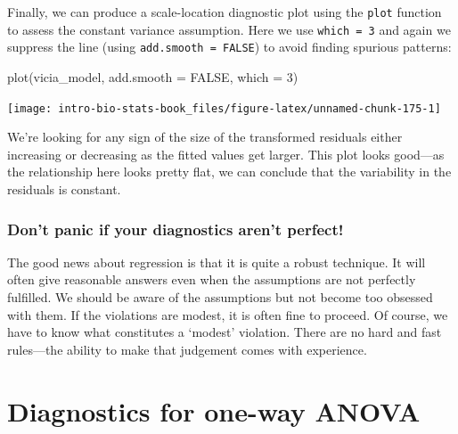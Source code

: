 \documentclass[
]{book}
\newenvironment{Shaded}{\begin{snugshade}}{\end{snugshade}}
\newcommand{\AttributeTok}[1]{\textcolor[rgb]{0.77,0.63,0.00}{#1}}
\newcommand{\ConstantTok}[1]{\textcolor[rgb]{0.00,0.00,0.00}{#1}}
\newcommand{\DecValTok}[1]{\textcolor[rgb]{0.00,0.00,0.81}{#1}}
\newcommand{\FunctionTok}[1]{\textcolor[rgb]{0.00,0.00,0.00}{#1}}
\newcommand{\NormalTok}[1]{#1}
\newenvironment{greybox}{
  \definecolor{shadecolor}{rgb}{0.95,0.95,0.95}  %
  \color{black}
  \begin{shaded}}
 {\end{shaded}}
\newenvironment{infobox}[1]
  {
  \begin{itemize}
  \renewcommand{\labelitemi}{
    \raisebox{-.7\height}[0pt][0pt]{
      {\setkeys{Gin}{width=3em,keepaspectratio}
        \texttt{[image: images/\#1]}}
    }
  }
  \setlength{\fboxsep}{1em}
  \begin{greybox}
  \item
  }
  {
  \end{greybox}
  \end{itemize}
  }
\begin{document}
Finally, we can produce a scale-location diagnostic plot using the \texttt{plot} function to assess the constant variance assumption. Here we use \texttt{which\ =\ 3} and again we suppress the line (using \texttt{add.smooth\ =\ FALSE}) to avoid finding spurious patterns:

\begin{Shaded}
\begin{Highlighting}[]
\FunctionTok{plot}\NormalTok{(vicia\_model, }\AttributeTok{add.smooth =} \ConstantTok{FALSE}\NormalTok{, }\AttributeTok{which =} \DecValTok{3}\NormalTok{)}
\end{Highlighting}
\end{Shaded}

\begin{center}\texttt{[image: intro-bio-stats-book\_files/figure-latex/unnamed-chunk-175-1]} \end{center}

We're looking for any sign of the size of the transformed residuals either increasing or decreasing as the fitted values get larger. This plot looks good---as the relationship here looks pretty flat, we can conclude that the variability in the residuals is constant.

\begin{infobox}{warning}

\hypertarget{dont-panic-if-your-diagnostics-arent-perfect}{%
\subsubsection*{Don't panic if your diagnostics aren't perfect!}\label{dont-panic-if-your-diagnostics-arent-perfect}}

The good news about regression is that it is quite a robust technique. It will often give reasonable answers even when the assumptions are not perfectly fulfilled. We should be aware of the assumptions but not become too obsessed with them. If the violations are modest, it is often fine to proceed. Of course, we have to know what constitutes a `modest' violation. There are no hard and fast rules---the ability to make that judgement comes with experience.

\end{infobox}

\hypertarget{diagnostics-for-one-way-anova}{%
\section{Diagnostics for one-way ANOVA}\label{diagnostics-for-one-way-anova}}
\end{document}
